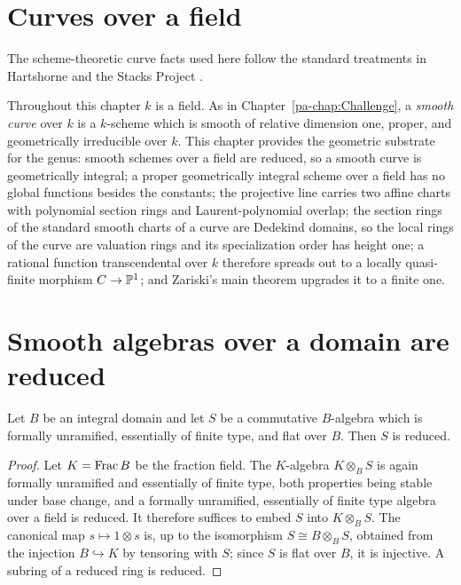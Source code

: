 \section{Curves over a field}
\label{pa-chap:Curves}

The scheme-theoretic curve facts used here follow the standard treatments in Hartshorne
\cite{hartshorne-ag} and the Stacks Project \cite{stacks-project}.

Throughout this chapter \(k\) is a field. As in Chapter~\ref{pa-chap:Challenge}, a \emph{smooth
curve} over \(k\) is a \(k\)-scheme which is smooth of relative dimension one, proper, and
geometrically irreducible over \(k\). This chapter provides the geometric substrate for the
genus: smooth schemes over a field are reduced, so a smooth curve is geometrically integral;
a proper geometrically integral scheme over a field has no global functions besides the
constants; the projective line carries two affine charts with polynomial section rings and
Laurent-polynomial overlap; the section rings of the standard smooth charts of a curve are
Dedekind domains, so the local rings of the curve are valuation rings and its
specialization order has height one; a rational function transcendental over \(k\) therefore
spreads out to a locally quasi-finite morphism \(C \to \mathbb{P}^1\); and Zariski's main theorem
upgrades it to a finite one.

\section{Smooth algebras over a domain are reduced}

\begin{lemma}
  \label{pa-lem:unramified_flat_reduced}
  \leanok

  Let \(B\) be an integral domain and let \(S\) be a commutative \(B\)-algebra which is
  formally unramified, essentially of finite type, and flat over \(B\). Then \(S\) is reduced.
\end{lemma}
\begin{proof}
  \leanok
  Let \(K = \operatorname{Frac} B\) be the fraction field. The \(K\)-algebra \(K \otimes_B S\) is again
  formally unramified and essentially of finite type, both properties being stable under base
  change, and a formally unramified, essentially of finite type algebra over a field is
  reduced. It therefore suffices to embed \(S\) into \(K \otimes_B S\). The canonical map
  \(s \mapsto 1 \otimes s\) is, up to the isomorphism \(S \cong B \otimes_B S\), obtained from
  the injection \(B \hookrightarrow K\) by tensoring with \(S\); since \(S\) is flat over
  \(B\), it is injective. A subring of a reduced ring is reduced.
\end{proof}

